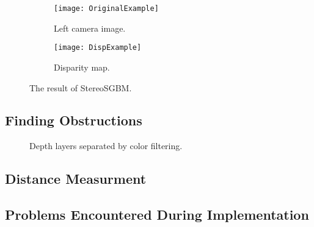 \begin{figure}
\centering
 \begin{subfigure}[b]{0.45\textwidth}
        \texttt{[image: OriginalExample]}
        \caption{Left camera image.}
        \label{fig:OriginalExample}
    \end{subfigure}
    \begin{subfigure}[b]{0.45\textwidth}
        \texttt{[image: DispExample]}
        \caption{Disparity map.}
        \label{fig:DispExample}
    \end{subfigure}
    \caption{\label{fig:StereoMatching}The result of StereoSGBM.}
\end{figure}

\subsection{Finding Obstructions}

\begin{wrapfigure}{r}{0.4\textwidth}
\centering
{}\par\medskip
{}\par\medskip        
{}
\caption{Depth layers separated by color filtering.}
\label{fig:layers}
\end{wrapfigure}



\subsection{Distance Measurment}

\subsection{Problems Encountered During Implementation }